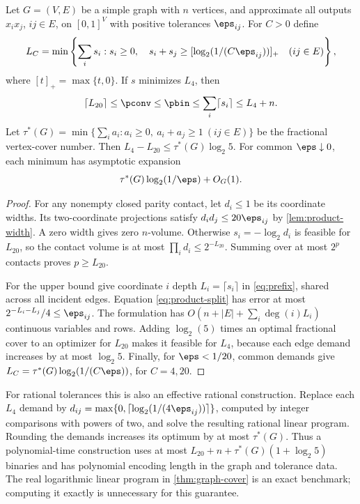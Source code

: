 \begin{theorem}\label{thm:graph-cover}
Let $G=(V,E)$ be a simple graph with $n$ vertices, and approximate all
outputs $x_ix_j$, $ij\in E$, on $[0,1]^V$ with positive tolerances
$\eps_{ij}$. For $C>0$ define
\[
 L_C=\min\left\{\sum_i s_i:s_i\ge0,\quad
 s_i+s_j\ge[\log_2(1/(C\eps_{ij}))]_+\quad(ij\in E)\right\},
\]
where $[t]_+=\max\{t,0\}$. If $s$ minimizes $L_4$, then
\begin{equation}\label{eq:graph-finite}
 \lceil L_{20}\rceil\le\pconv\le\pbin
 \le\sum_i\lceil s_i\rceil\le L_4+n.
\end{equation}
Let $\tau^*(G)=\min\{\sum_i a_i:a_i\ge0,\ a_i+a_j\ge1\ (ij\in E)\}$
be the fractional vertex-cover number. Then
$L_4-L_{20}\le\tau^*(G)\log_2 5$.
For common $\eps\downarrow0$, each minimum has asymptotic expansion
\[
 \tau^*(G)\log_2(1/\eps)+O_G(1).
\]
\end{theorem}
\begin{proof}
For any nonempty closed parity contact, let $d_i\le1$ be its coordinate
widths. Its two-coordinate projections satisfy
$d_id_j\le20\eps_{ij}$ by \cref{lem:product-width}. A zero width gives
zero $n$-volume. Otherwise $s_i=-\log_2d_i$ is feasible for $L_{20}$,
so the contact volume is at most $\prod_i d_i\le2^{-L_{20}}$.
Summing over at most $2^p$ contacts proves $p\ge L_{20}$.

For the upper bound give coordinate $i$ depth $L_i=\lceil s_i\rceil$
in \eqref{eq:prefix}, shared across all incident edges. Equation
\eqref{eq:product-split} has error at most
$2^{-L_i-L_j}/4\le\eps_{ij}$. The formulation has
$O(n+|E|+\sum_i\deg(i)L_i)$ continuous variables and rows. Adding
$\log_2(5)$ times an optimal fractional cover to an optimizer for
$L_{20}$ makes it feasible for $L_4$, because each edge demand increases
by at most $\log_2 5$. Finally, for $\eps<1/20$, common demands give
$L_C=\tau^*(G)\log_2(1/(C\eps))$, for $C=4,20$.
\end{proof}

For rational tolerances this is also an effective rational construction.
Replace each $L_4$ demand by
$d_{ij}=\max\{0,\lceil\log_2(1/(4\eps_{ij}))\rceil\}$,
computed by integer comparisons with powers of two, and solve the
resulting rational linear program. Rounding the demands increases its
optimum by at most $\tau^*(G)$. Thus a polynomial-time construction uses
at most $L_{20}+n+\tau^*(G)(1+\log_2 5)$ binaries and has polynomial
encoding length in the graph and tolerance data. The real logarithmic
linear program in \cref{thm:graph-cover} is an exact benchmark; computing
it exactly is unnecessary for this guarantee.

